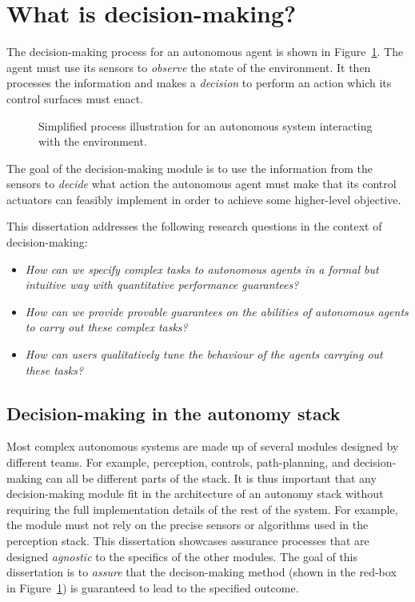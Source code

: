 \section{What is decision-making?}

The decision-making process for an autonomous agent is shown in Figure~\ref{fig:decisionloop}. The agent must use its sensors to \emph{observe} the state of the environment. It then processes the information and makes a \emph{decision} to perform an action which its control surfaces must enact.






\begin{figure}
	\centering
	
	\caption{Simplified process illustration for an autonomous system interacting with the environment.}\label{fig:decisionloop}
\end{figure}


The goal of the decision-making module is to use the information from the sensors to \emph{decide} what action the autonomous agent must make that its control actuators can feasibly implement in order to achieve some higher-level objective. 

This dissertation addresses the following research questions in the context of decision-making:

\begin{itemize}
	\item \emph{How can we specify complex tasks to autonomous agents in a formal but intuitive way with quantitative performance guarantees?}
	\item \emph{How can we provide provable guarantees on the abilities of autonomous agents to carry out these complex tasks?}
	\item \emph{How can users qualitatively tune the behaviour of the agents carrying out these tasks?}
\end{itemize}


\subsection{Decision-making in the autonomy stack}


Most complex autonomous systems are made up of several modules designed by different teams. For example, perception, controls, path-planning, and decision-making can all be different parts of the stack. It is thus important that any decision-making module fit in the architecture of an autonomy stack without requiring the full implementation details of the rest of the system. For example, the module must not rely on the precise sensors or algorithms used in the perception stack. This dissertation showcases assurance processes that are designed \emph{agnostic} to the specifics of the other modules. The goal of this dissertation is to \emph{assure} that the decison-making method (shown in the red-box in Figure~\ref{fig:decisionloop}) is guaranteed to lead to the specified outcome.  

